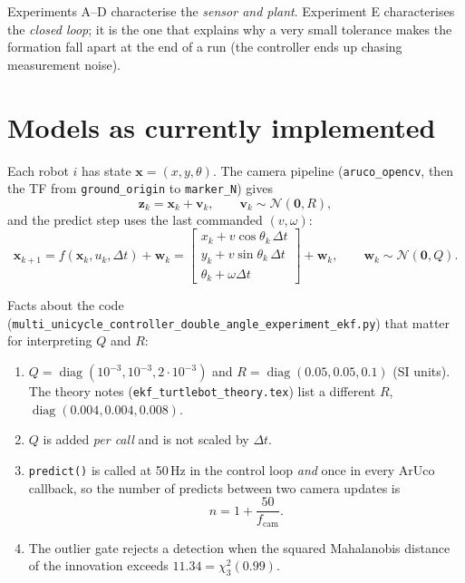 \documentclass[11pt,a4paper]{article}
\begin{document}
Experiments A--D characterise the \emph{sensor and plant}. Experiment E
characterises the \emph{closed loop}; it is the one that explains why a
very small tolerance makes the formation fall apart at the end of a run
(the controller ends up chasing measurement noise).

\section{Models as currently implemented}
\label{sec:model}

Each robot $i$ has state $\bm{x}=(x,y,\theta)$. The camera pipeline
(\texttt{aruco\_opencv}, then the TF from \texttt{ground\_origin} to
\texttt{marker\_N}) gives
\begin{equation}
  \bm{z}_k = \bm{x}_k + \bm{v}_k,\qquad \bm{v}_k\sim\mathcal{N}(\bm{0},R),
  \label{eq:meas}
\end{equation}
and the predict step uses the last commanded $(v,\omega)$:
\begin{equation}
  \bm{x}_{k+1} = f(\bm{x}_k,u_k,\Delta t) + \bm{w}_k =
  \begin{bmatrix} x_k + v\cos\theta_k\,\Delta t\\ y_k + v\sin\theta_k\,\Delta t\\ \theta_k+\omega\Delta t\end{bmatrix} + \bm{w}_k,
  \qquad \bm{w}_k\sim\mathcal{N}(\bm{0},Q).
  \label{eq:proc}
\end{equation}

Facts about the code (\texttt{multi\_unicycle\_controller\_\allowbreak double\_angle\_\allowbreak experiment\_ekf.py})
that matter for interpreting $Q$ and $R$:
\begin{enumerate}[leftmargin=*]
\item $Q=\operatorname{diag}(10^{-3},10^{-3},2\cdot10^{-3})$ and
      $R=\operatorname{diag}(0.05,0.05,0.1)$ (SI units). The theory notes
      (\texttt{ekf\_turtlebot\_theory.tex}) list a different $R$,
      $\operatorname{diag}(0.004,0.004,0.008)$.
\item $Q$ is added \emph{per call} and is not scaled by $\Delta t$.
\item \texttt{predict()} is called at 50\,Hz in the control loop
      \emph{and} once in every ArUco callback, so the number of predicts
      between two camera updates is
      \begin{equation}
        n = 1 + \frac{50}{f_\text{cam}}.
        \label{eq:n}
      \end{equation}
\item The outlier gate rejects a detection when the squared Mahalanobis
      distance of the innovation exceeds $11.34=\chi^2_{3}(0.99)$.
\end{enumerate}
\end{document}
